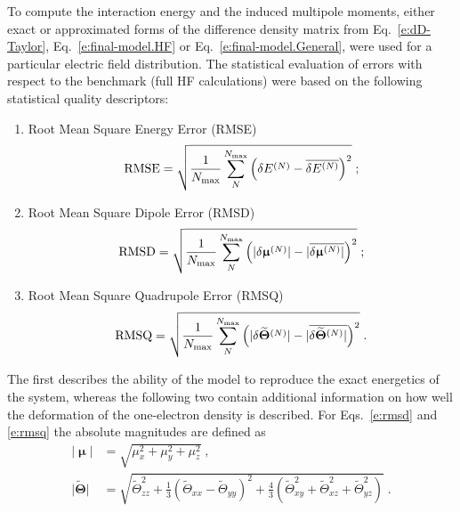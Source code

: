 \documentclass[aip,amsmath,amssymb,reprint,floatfix]{revtex4-1}
\newcommand{\BM}[1]{\bm{#1}}
\begin{document}
To compute the interaction energy and the induced multipole moments, either exact or approximated forms
of the difference density matrix from Eq.~\eqref{e:dD-Taylor}, Eq.~\eqref{e:final-model.HF} or Eq.~\eqref{e:final-model.General},
were used for a particular electric field distribution. The statistical evaluation of
errors with respect to the benchmark (full HF calculations) were based on 
the following statistical quality descriptors:
%
\begin{enumerate}
 \item Root Mean Square Energy Error (RMSE)
   \begin{equation}\label{e:rmse}
     {\rm RMSE} = \sqrt{ \frac{1}{N_{\rm max}} \sum_N^{N_{\rm max}} \left( \delta E^{(N)} - \overline{\delta E^{(N)}}\right)^2 } \;;
   \end{equation}
 \item Root Mean Square Dipole Error (RMSD)
   \begin{equation}\label{e:rmsd}
     {\rm RMSD} = \sqrt{ \frac{1}{N_{\rm max}}\sum_N^{N_{\rm max}} \left( \lvert \delta {\BM\upmu}^{(N)} \rvert 
                                             - \lvert \overline{\delta {\BM\upmu}^{(N)} \rvert }\right)^2 } \;;
   \end{equation}
 \item Root Mean Square Quadrupole Error (RMSQ)
   \begin{equation}\label{e:rmsq}
     {\rm RMSQ} = \sqrt{ \frac{1}{N_{\rm max}}\sum_N^{N_{\rm max}} \left( \lvert \delta \widetilde{\BM\Theta}^{(N)} \rvert 
                                             - \lvert \overline{\delta \widetilde{\BM\Theta}^{(N)} \rvert }\right)^2 } \;.
   \end{equation}
\end{enumerate}
%
The first describes the ability of the model to reproduce the exact energetics of the system, 
whereas the following two contain additional information on how well the deformation of the one\hyp{}electron
density is described. For Eqs.~\eqref{e:rmsd} and \eqref{e:rmsq} the absolute magnitudes
are defined as
%
\begin{subequations}\label{e:absmagn}
  \begin{align}
   \lvert {\BM\upmu} \rvert &= \sqrt{\mu_x^2+\mu_y^2+\mu_z^2} \;,\\
   \lvert {\widetilde{\BM\Theta}}\rvert &= 
          \sqrt{\widetilde{\Theta}_{zz}^2 + \frac{1}{3}\left(\widetilde{\Theta}_{xx}-\widetilde{\Theta}_{yy}\right)^2 
          + \frac{4}{3}\left( \widetilde{\Theta}_{xy}^2 + \widetilde{\Theta}_{xz}^2 + \widetilde{\Theta}_{yz}^2 \right)} \;. 
  \end{align}
\end{subequations}
\end{document}
